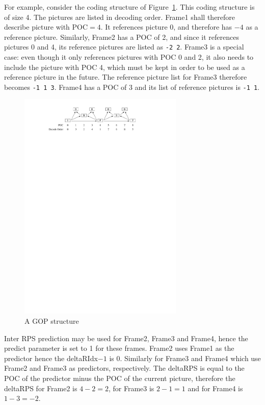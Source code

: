 \documentclass[a3paper,11pt]{jctvcdoc}
\begin{document}
For example, consider the coding structure of Figure~\ref{fig:gop-example}.
This coding structure is of size 4. The pictures are listed in decoding
order. Frame1 shall therefore describe picture with $\textrm{POC}=4$. It
references picture 0, and therefore has $-4$ as a reference picture.
Similarly, Frame2 has a POC of 2, and since it references pictures 0 and
4, its reference pictures are listed as \verb|-2 2|. Frame3 is a special
case: even though it only references pictures with POC 0 and 2, it also
needs to include the picture with POC 4, which must be kept in order to
be used as a reference picture in the future. The reference picture list
for Frame3 therefore becomes \verb|-1 1 3|. Frame4 has a POC of 3 and
its list of reference pictures is \verb|-1 1|.

\begin{figure}[h]
    \caption{A GOP structure}
    \label{fig:gop-example}
    \centering
    \includegraphics[width=0.7\textwidth]{gop-structure-example}
\end{figure}

Inter RPS prediction may be used for Frame2, Frame3 and Frame4, hence
the predict parameter is set to 1 for these frames. Frame2 uses Frame1
as the predictor hence the deltaRIdx$-1$ is 0.  Similarly for Frame3 and
Frame4 which use Frame2 and Frame3 as predictors, respectively. The
deltaRPS is equal to the POC of the predictor minus the POC of the
current picture, therefore the deltaRPS for Frame2 is $4 -2 = 2$, for
Frame3 is $2 - 1 = 1$ and for Frame4 is $1 - 3 = -2$.
\end{document}
